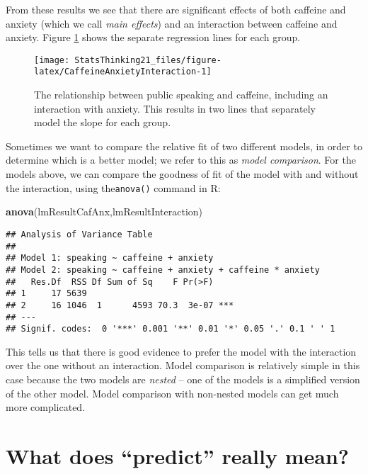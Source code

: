 \documentclass[]{book}
\newenvironment{Shaded}{\begin{snugshade}}{\end{snugshade}}
\newcommand{\KeywordTok}[1]{\textcolor[rgb]{0.13,0.29,0.53}{\textbf{#1}}}
\newcommand{\NormalTok}[1]{#1}
\theoremstyle{definition}
\theoremstyle{definition}
\theoremstyle{definition}
\theoremstyle{remark}
\begin{document}
From these results we see that there are significant effects of both
caffeine and anxiety (which we call \emph{main effects}) and an
interaction between caffeine and anxiety. Figure
\ref{fig:CaffeineAnxietyInteraction} shows the separate regression lines
for each group.

\begin{figure}
\texttt{[image: StatsThinking21\_files/figure-latex/CaffeineAnxietyInteraction-1]} \caption{The relationship between public speaking and caffeine, including an interaction with anxiety.  This results in two lines that separately model the slope for each group.}\label{fig:CaffeineAnxietyInteraction}
\end{figure}

Sometimes we want to compare the relative fit of two different models,
in order to determine which is a better model; we refer to this as
\emph{model comparison}. For the models above, we can compare the
goodness of fit of the model with and without the interaction, using
the\texttt{anova()} command in R:

\begin{Shaded}
\begin{Highlighting}[]
\KeywordTok{anova}\NormalTok{(lmResultCafAnx,lmResultInteraction)}
\end{Highlighting}
\end{Shaded}

\begin{verbatim}
## Analysis of Variance Table
## 
## Model 1: speaking ~ caffeine + anxiety
## Model 2: speaking ~ caffeine + anxiety + caffeine * anxiety
##   Res.Df  RSS Df Sum of Sq    F Pr(>F)    
## 1     17 5639                             
## 2     16 1046  1      4593 70.3  3e-07 ***
## ---
## Signif. codes:  0 '***' 0.001 '**' 0.01 '*' 0.05 '.' 0.1 ' ' 1
\end{verbatim}

This tells us that there is good evidence to prefer the model with the
interaction over the one without an interaction. Model comparison is
relatively simple in this case because the two models are \emph{nested}
-- one of the models is a simplified version of the other model. Model
comparison with non-nested models can get much more complicated.

\section{\texorpdfstring{What does ``predict'' really
mean?}{What does predict really mean?}}\label{what-does-predict-really-mean}
\end{document}
